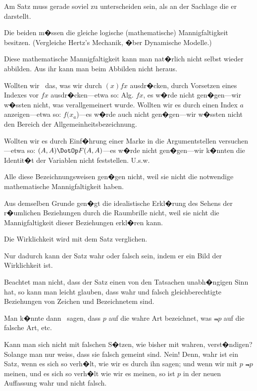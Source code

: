 {Am Satz muss gerade soviel zu unterscheiden
sein, als an der Sachlage die er darstellt.

{\stretchyspace
Die beiden m�ssen die gleiche logische (mathematische)
Mannigfaltigkeit besitzen. (Vergleiche
Hertz's Mechanik, �ber Dynamische Modelle.)}}


{Diese mathematische Mannigfaltigkeit kann
man nat�rlich nicht selbst wieder abbilden. Aus
ihr kann man beim Abbilden nicht heraus.}


{Wollten wir \zumBeispiel\ das, was wir durch \glqq{}$(x) fx$\grqq{}
ausdr�cken, durch Vorsetzen eines Indexes vor
\glqq{}$fx$\grqq{} ausdr�cken---etwa so: \glqq{}Alg. $fx$\grqq{}, es w�rde
nicht gen�gen---wir w�ssten nicht, was verallgemeinert
wurde. Wollten wir es durch einen
Index \glqq{}$a$\grqq{} anzeigen---etwa so: \glqq{}$f(x_{a}$)\grqq{}---es w�rde
auch nicht gen�gen---wir w�ssten nicht den
Bereich der Allgemeinheitsbezeichnung.

Wollten wir es durch Einf�hrung einer Marke
in die Argumentstellen ver\-su\-chen---etwa so:
\glqq{}$(A, A) \DotOp F (A, A)$\grqq{}---es w�rde nicht ge\-n�\-gen---wir
k�nnten die Identit�t der Variablen nicht feststellen.
U.s.w.

Alle diese Bezeichnungsweisen gen�gen nicht,
weil sie nicht die notwendige mathematische
Mannigfaltigkeit haben.}


{{\stretchyspace
Aus demselben Grunde gen�gt die idealistische
Erkl�rung des Sehens der r�umlichen Beziehungen
durch die \glqq{}Raumbrille\grqq{} nicht, weil sie nicht die
Mannigfaltigkeit dieser Beziehungen erkl�ren kann.}}


{Die Wirklichkeit wird mit dem Satz verglichen.}


{Nur dadurch kann der Satz wahr oder falsch
sein, indem er ein Bild der Wirklichkeit ist.}


{Beachtet man nicht, dass der Satz einen von
den Tatsachen unabh�ngigen Sinn hat, so kann
man leicht glauben, dass wahr und falsch gleichberechtigte
Beziehungen von Zeichen und Bezeichnetem
sind.

Man k�nnte dann \zumBeispiel\ sagen, dass \glqq{}$p$\grqq{} auf die
wahre Art bezeichnet, was \glqq{}$\Not{p}$\grqq{} auf die falsche
Art, etc.}


{Kann man sich nicht mit falschen S�tzen, wie
bisher mit wahren, verst�ndigen? Solange man
nur weiss, dass sie falsch gemeint sind. Nein!
Denn, wahr ist ein Satz, wenn es sich so verh�lt,
wie wir es durch ihn sagen; und wenn wir mit
\glqq{}$p$\grqq{} $\Not{p}$ meinen, und es sich so verh�lt wie wir es
meinen, so ist \glqq{}$p$\grqq{} in der neuen Auffassung wahr
und nicht falsch.}


